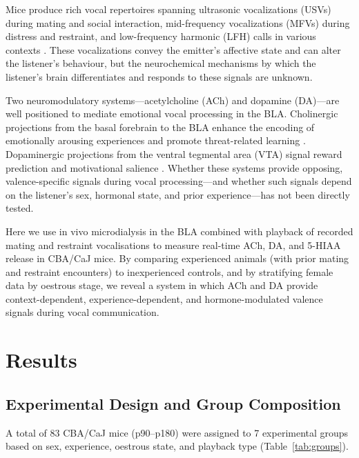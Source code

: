 \documentclass[11pt]{article}
\begin{document}
Mice produce rich vocal repertoires spanning ultrasonic vocalizations (USVs) during mating and social interaction, mid-frequency vocalizations (MFVs) during distress and restraint, and low-frequency harmonic (LFH) calls in various contexts \citep{portfors2007types, holy2005ultrasonic, ehret2005infant}. These vocalizations convey the emitter's affective state and can alter the listener's behaviour, but the neurochemical mechanisms by which the listener's brain differentiates and responds to these signals are unknown.

Two neuromodulatory systems---acetylcholine (ACh) and dopamine (DA)---are well positioned to mediate emotional vocal processing in the BLA. Cholinergic projections from the basal forebrain to the BLA enhance the encoding of emotionally arousing experiences and promote threat-related learning \citep{hasselmo2006role, mcgaugh2004amygdala, jiang2013cholinergic}. Dopaminergic projections from the ventral tegmental area (VTA) signal reward prediction and motivational salience \citep{schultz1997neural, wise2004dopamine, stuber2011excitatory}. Whether these systems provide opposing, valence-specific signals during vocal processing---and whether such signals depend on the listener's sex, hormonal state, and prior experience---has not been directly tested.

Here we use in vivo microdialysis in the BLA combined with playback of recorded mating and restraint vocalisations to measure real-time ACh, DA, and 5-HIAA release in CBA/CaJ mice. By comparing experienced animals (with prior mating and restraint encounters) to inexperienced controls, and by stratifying female data by oestrous stage, we reveal a system in which ACh and DA provide context-dependent, experience-dependent, and hormone-modulated valence signals during vocal communication.

\section{Results}

\subsection{Experimental Design and Group Composition}

A total of 83 CBA/CaJ mice (p90--p180) were assigned to 7 experimental groups based on sex, experience, oestrous state, and playback type (Table~\ref{tab:groups}).
\end{document}
